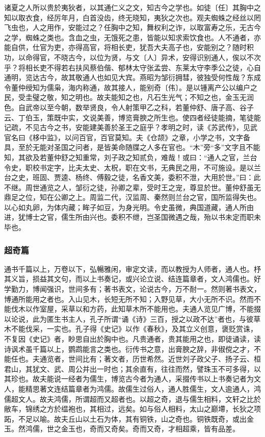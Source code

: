 \documentclass[]{article}
\begin{document}
诸夏之人所以贵於夷狄者，以其通仁义之文，知古今之学也。如徒〔任〕其胸中之知以取衣食，经厉年月，白首没齿，终无晓知，夷狄之次也。观夫蜘蛛之经丝以罔飞虫也，人之用作，安能过之？任胸中之知，舞权利之诈，以取富寿之乐，无古今之学，蜘蛛之类也。含血之虫，无饿死之患，皆能以知求索饮食也。人不通者，亦能自供，仕官为吏，亦得高官，将相长吏，犹吾大夫高子也，安能别之？随时积功，以命得官，不晓古今，以位为贤，与文〔人〕异术，安得识别通人，俟以不次乎？将相长吏不得若右扶风蔡伯偕、郁林太守张孟尝、东莱太守李季公之徒，心自通明，览达古今，故其敬通人也如见大宾。燕昭为邹衍拥彗，彼独受何性哉？东成令董仲绶知为儒枭，海内称通，故其接人，能别奇〔伟〕。是以锺离产公以编户之民，受圭璧之敬，知之明也。故夫能知之也，凡石生光气；不知之也，金玉无润色。自武帝以至今朝，数举贤良，令人射策甲乙之科，若董仲舒、唐子高、谷子云、丁伯玉，策既中实，文说美善，博览膏腴之所生也。使四者经徒能摘，笔徒能记疏，不见古今之书，安能建美善於圣王之庭乎？孝明之时，读《苏武传》，见武官名曰《栘中监》，以问百官，百官莫知。夫《仓颉》之章，小学之书，文字备具，至於无能对圣国之问者，是皆美命随牒之人多在官也。``木''旁``多''文字且不能知，其欲及若董仲舒之知重常，刘子政之知贰负，难哉！或曰：``通人之官，兰台令史，职校书定字，比夫太史、太柷，职在文书，无典民之用，不可施设。是以兰台之史，班固、贾逵、杨终、傅毅之徒，名香文美，委积不泄，大用於世。''曰：此不继。周世通览之人，邹衍之徒，孙卿之辈，受时王之宠，尊显於世。董仲舒虽无鼎足之位，知在公卿之上。周监二代，汉监周、秦然则兰台之官，国所监得失也。以心如丸卵，为体内藏；眸子如豆，为身光明。令史虽微，典国道藏，通人所由进，犹博士之官，儒生所由兴也。委积不绁，岂圣国微遇之哉，殆以书未定而职未毕也。

\hypertarget{header-n574}{%
\subsubsection{超奇篇}\label{header-n574}}

通书千篇以上，万卷以下，弘暢雅闲，审定文读，而以教授为人师者，通人也。杼其义旨，损益其文句，而以上书奏记，或兴论立说、结连篇章者，文人鸿儒也。好学勤力，博闻强识，世间多有；著书表文，论说古今，万不耐一。然则著书表文，博通所能用之者也。入山见木，长短无所不知；入野见草，大小无所不识。然而不能伐木以作室屋，采草以和方药，此知草木所不能用也。夫通人览见广博，不能掇以论说，此为匿生书主人，孔子所谓``诵《诗》三百，授之以政不达''者也，与彼草木不能伐采，一实也。孔子得《史记》以作《春秋》，及其立义创意，褒贬赏诛，不复因《史记》者，眇思自出於胸中也。凡贵通者，贵其能用之也，即徒诵读，读诗讽术虽千篇以上，鹦鹉能言之类也。衍传书之意，出膏腴之辞，非俶傥之才，不能任也。夫通览者，世间比有；著文者，历世希然。近世刘子政父子、扬子云、桓君山，其犹文、武、周公并出一时也；其余直有，往往而然，譬珠玉不可多得，以其珍也。故夫能说一经者为儒生，博览古今者为通人，采掇传书以上书奏记者为文人，能精思著文连结篇章者为鸿儒。故儒生过俗人，通人胜儒生，文人逾通人，鸿儒超文人。故夫鸿儒，所谓超而又超者也。以超之奇，退与儒生相料，文轩之比於敝车，锦绣之方於缊袍也，其相过，远矣。如与俗人相料，太山之巅墆，长狄之项跖，不足以喻。故夫丘山以土石为体，其有铜铁，山之奇也。铜铁既奇，或出金玉。然鸿儒，世之金玉也，奇而又奇矣。奇而又奇，才相超乘，皆有品差。
\end{document}
